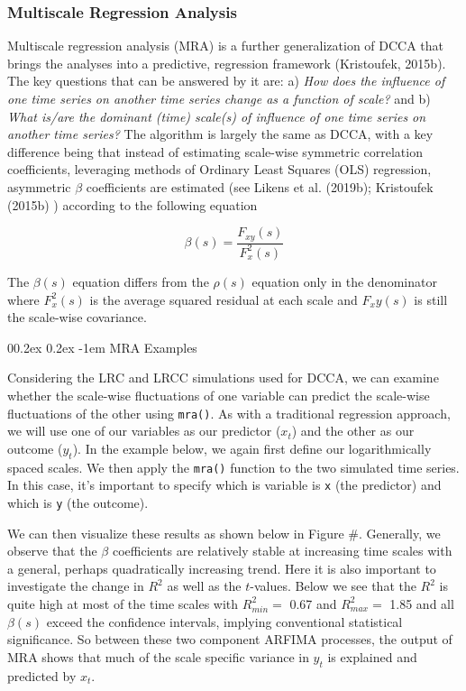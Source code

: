 \documentclass[
  man]{apa6}
\makeatletter
\let\oldparagraph\paragraph
\renewcommand{\paragraph}[1]{\oldparagraph{#1}\mbox{}}
\renewcommand{\paragraph}{\@startsection{paragraph}{4}{\parindent}%
  {0\baselineskip \@plus 0.2ex \@minus 0.2ex}%
  {-1em}%
  {\normalfont\normalsize\bfseries\itshape\typesectitle}}
\makeatother
\begin{document}
\hypertarget{multiscale-regression-analysis}{%
\subsubsection{Multiscale Regression Analysis}\label{multiscale-regression-analysis}}

Multiscale regression analysis (MRA) is a further generalization of DCCA
that brings the analyses into a predictive, regression framework
(Kristoufek, 2015b). The key questions that can be answered by it are: a)
\emph{How does the influence of one time series on another time series change
as a function of scale?} and b) \emph{What is/are the dominant (time)
scale(s) of influence of one time series on another time series?} The
algorithm is largely the same as DCCA, with a key difference being that
instead of estimating scale-wise symmetric correlation coefficients,
leveraging methods of Ordinary Least Squares (OLS) regression,
asymmetric \(\beta\) coefficients are estimated (see Likens et al. (2019b);
Kristoufek (2015b) ) according to the following equation

\[
\beta(s)=\frac{F_{xy}(s)}{F^2_x(s)}
\]

The \(\beta(s)\) equation differs from the \(\rho(s)\) equation only in the
denominator where \(F^2_x(s)\) is the average squared residual at each
scale and \(F_xy(s)\) is still the scale-wise covariance.

\hypertarget{mra-examples}{%
\paragraph{MRA Examples}\label{mra-examples}}

Considering the LRC and LRCC simulations used for DCCA, we can examine
whether the scale-wise fluctuations of one variable can predict the
scale-wise fluctuations of the other using \texttt{mra()}. As with a
traditional regression approach, we will use one of our variables as our
predictor (\(x_t\)) and the other as our outcome (\(y_t\)). In the example
below, we again first define our logarithmically spaced scales. We then
apply the \texttt{mra()} function to the two simulated time series. In this
case, it's important to specify which is variable is \texttt{x} (the predictor)
and which is \texttt{y} (the outcome).

We can then visualize these results as shown below in Figure \#.
Generally, we observe that the \(\beta\) coefficients are relatively
stable at increasing time scales with a general, perhaps quadratically
increasing trend. Here it is also important to investigate the change in
\(R^2\) as well as the \(t\)-values. Below we see that the \(R^2\) is quite
high at most of the time scales with \(R^2_{min} =\)
0.67 and \(R^2_{max} =\)
1.85 and all \(\beta(s)\) exceed the confidence
intervals, implying conventional statistical significance. So between
these two component ARFIMA processes, the output of MRA shows that much
of the scale specific variance in \(y_t\) is explained and predicted by
\(x_t\).
\end{document}
